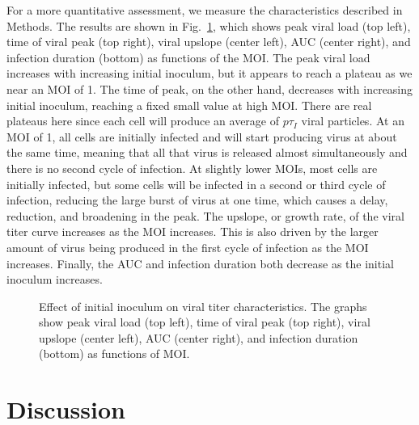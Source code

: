 For a more quantitative assessment, we measure the characteristics described in Methods. The results are shown in Fig.\ \ref{results}, which shows peak viral load (top left), time of viral peak (top right), viral upslope (center left), AUC (center right), and infection duration (bottom) as functions of the MOI. The peak viral load increases with increasing initial inoculum, but it appears to reach a plateau as we near an MOI of 1. The time of peak, on the other hand, decreases with increasing initial inoculum, reaching a fixed small value at high MOI. There are real plateaus here since each cell will produce an average of $p\tau_I$ viral particles. At an MOI of 1, all cells are initially infected and will start producing virus at about the same time, meaning that all that virus is released almost simultaneously and there is no second cycle of infection. At slightly lower MOIs, most cells are initially infected, but some cells will be infected in a second or third cycle of infection, reducing the large burst of virus at one time, which causes a delay, reduction, and broadening in the peak. The upslope, or growth rate, of the viral titer curve increases as the MOI increases. This is also driven by the larger amount of virus being produced in the first cycle of infection as the MOI increases. Finally, the AUC and infection duration both decrease as the initial inoculum increases.  
\begin{figure}[!h]
\begin{center}
\caption{Effect of initial inoculum on viral titer characteristics. The graphs show peak viral load (top left), time of viral peak (top right), viral upslope (center left), AUC (center right), and infection duration (bottom) as functions of MOI. \label{results}}
\end{center}
\end{figure}

\section{Discussion}


